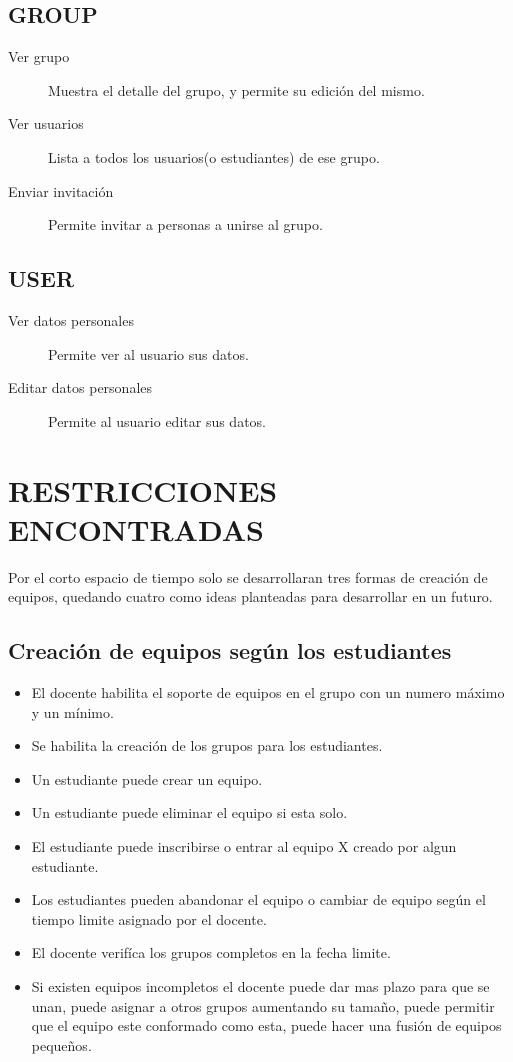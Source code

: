 \documentclass[letterpaper,spanish]{article}
\begin{document}
    \subsection{GROUP}
        \begin{description}
            \item [Ver grupo] Muestra el detalle del grupo, y permite su edici\'on del mismo.
            \item [Ver usuarios] Lista a todos los usuarios(o estudiantes) de ese grupo.
            \item [Enviar invitaci\'on] Permite invitar a personas a unirse al grupo.
        \end{description}
    \subsection{USER}
        \begin {description}
            \item [Ver datos personales] Permite ver al usuario sus datos.
            \item [Editar datos personales] Permite al usuario editar sus datos.
        \end {description}

\section{RESTRICCIONES ENCONTRADAS}
Por el corto espacio de tiempo solo se desarrollaran tres formas de creaci\'on de equipos, quedando cuatro como 
ideas planteadas para desarrollar en un futuro.

\subsection {Creaci\'on de equipos seg\'un los estudiantes}
\begin{itemize}
    \item El docente habilita el soporte de equipos en el grupo con un numero m\'aximo y un m\'inimo.
    \item Se habilita la creaci\'on de los grupos para los estudiantes.
    \item Un estudiante puede crear un equipo.
    \item Un estudiante puede eliminar el equipo si esta solo.
    \item El estudiante puede inscribirse o entrar al equipo X creado por algun estudiante.
    \item Los estudiantes pueden abandonar el equipo o cambiar de equipo seg\'un el tiempo limite asignado 
    por el docente.
    \item El docente verif\'ica los grupos completos en la fecha limite.
    \item Si existen equipos incompletos el docente puede dar mas plazo para que se unan, puede asignar a 
    otros grupos aumentando su tama\~no, puede permitir que el equipo este conformado como esta, puede hacer 
    una fusi\'on de equipos peque\~nos.
\end{itemize}
\end{document}
